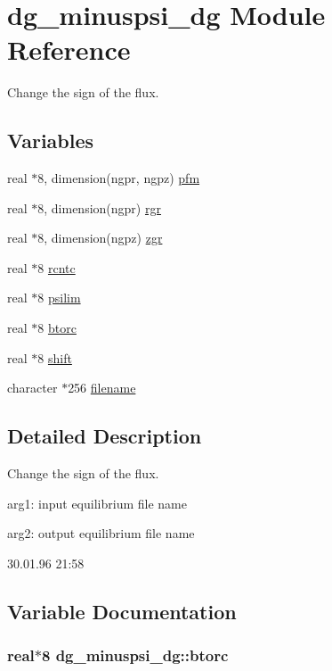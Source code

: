 \hypertarget{namespacedg__minuspsi__dg}{
\section{dg\_\-minuspsi\_\-dg Module Reference}
\label{namespacedg__minuspsi__dg}
}
Change the sign of the flux.  


\subsection*{Variables}
\begin{CompactItemize}
\item 
real $\ast$8, dimension(ngpr, ngpz) \hyperlink{namespacedg__minuspsi__dg_7c52d7de062161616c4daae88f302c48}{pfm}
\item 
real $\ast$8, dimension(ngpr) \hyperlink{namespacedg__minuspsi__dg_0c32314aec56f7439884635ae85f8414}{rgr}
\item 
real $\ast$8, dimension(ngpz) \hyperlink{namespacedg__minuspsi__dg_055027e90abf39aceabd4a50f02421ac}{zgr}
\item 
real $\ast$8 \hyperlink{namespacedg__minuspsi__dg_d70201e77c046670a22c0a662cf3ade5}{rcntc}
\item 
real $\ast$8 \hyperlink{namespacedg__minuspsi__dg_9a8c4ea8cf9c956b104c5de7d7f3bf43}{psilim}
\item 
real $\ast$8 \hyperlink{namespacedg__minuspsi__dg_c3c338a5853d966dbecf9104f273869e}{btorc}
\item 
real $\ast$8 \hyperlink{namespacedg__minuspsi__dg_1f21182b81c907694c4d1674bc7ef246}{shift}
\item 
character $\ast$256 \hyperlink{namespacedg__minuspsi__dg_2eaba41888ea9b54a4f395da5f6f962c}{filename}
\end{CompactItemize}


\subsection{Detailed Description}
Change the sign of the flux. 

arg1: input equilibrium file name

arg2: output equilibrium file name

\begin{Desc}
\item[Version:]30.01.96 21:58 \end{Desc}


\subsection{Variable Documentation}
\hypertarget{namespacedg__minuspsi__dg_c3c338a5853d966dbecf9104f273869e}{
\subsubsection[btorc]{\setlength{\rightskip}{0pt plus 5cm}real$\ast$8 {\bf dg\_\-minuspsi\_\-dg::btorc}}}
\label{namespacedg__minuspsi__dg_c3c338a5853d966dbecf9104f273869e}




